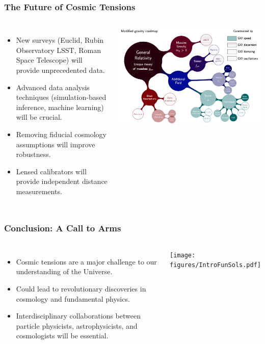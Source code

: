 \documentclass[aspectratio=169]{beamer}
\begin{document}
\begin{frame}
    \frametitle{The Future of Cosmic Tensions}
    \begin{columns}
        \begin{itemize}
            \item New surveys (Euclid, Rubin Observatory LSST, Roman Space Telescope) will provide unprecedented data.
            \item Advanced data analysis techniques (simulation-based inference, machine learning) will be crucial. 
            \item Removing fiducial cosmology assumptions will improve robustness.
            \item Lensed calibrators will provide independent distance measurements.
        \end{itemize}
        \includegraphics[width=\textwidth]{figures/Mod_Grav.pdf}
    \end{columns}
\end{frame}

\begin{frame}
    \frametitle{Conclusion: A Call to Arms}
    \begin{columns}
        \begin{itemize}
            \item Cosmic tensions are a major challenge to our understanding of the Universe.
            \item Could lead to revolutionary discoveries in cosmology and fundamental physics.
            \item Interdisciplinary collaborations between particle physicists, astrophysicists, and cosmologists will be essential.
        \end{itemize}
        \texttt{[image: figures/IntroFunSols.pdf]}
    \end{columns}
\end{frame}
\end{document}

